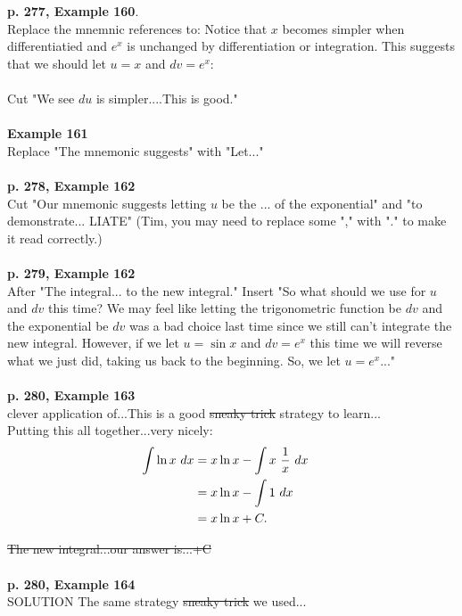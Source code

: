 \documentclass[11pt]{report}
\begin{document}
\textbf{p. 277, Example 160}.\\
Replace the mnemnic references to: Notice that $x$ becomes simpler when differentiatied and $e^x$ is unchanged by differentiation or integration. This suggests that we should let $u = x$ and $dv = e^x$:\\ \\
Cut "We see $du$ is simpler....This is good."\\ \\

\textbf{Example 161}\\
Replace "The mnemonic suggests" with "Let..." \\ \\

\textbf{p. 278, Example 162}\\
Cut "Our mnemonic suggests letting $u$ be the ... of the exponential"  and "to demonstrate... LIATE" (Tim, you may need to replace some "," with "." to make it read correctly.) \\ \\

\textbf{p. 279, Example 162}\\
After "The integral... to the new integral." Insert "So what should we use for $u$ and $dv$ this time? We may feel like letting the trigonometric function be $dv$ and the exponential be $dv$ was a bad choice last time since we still can't integrate the new integral. However, if we let $u = \sin x$ and $dv = e^x$ this time we will reverse what we just did, taking us back to the beginning. So, we let $u=e^x$..."\\ \\

\textbf{p. 280, Example 163}\\
clever application of...This is a good \sout{sneaky trick} strategy to learn... \\

Putting this all together...very nicely:
\begin{align}
\int \ln x ~dx &= x \ln x - \int x~ \frac{1}{x}~dx \cr
&= x\ln x - \int 1~dx \cr
&= x\ln x + C. \cr
\end{align}

\sout{The new integral...our answer is...+C}\\ \\

\textbf{p. 280, Example 164}\\
SOLUTION  The same strategy \sout{sneaky trick} we used...\\ \\
\end{document}
